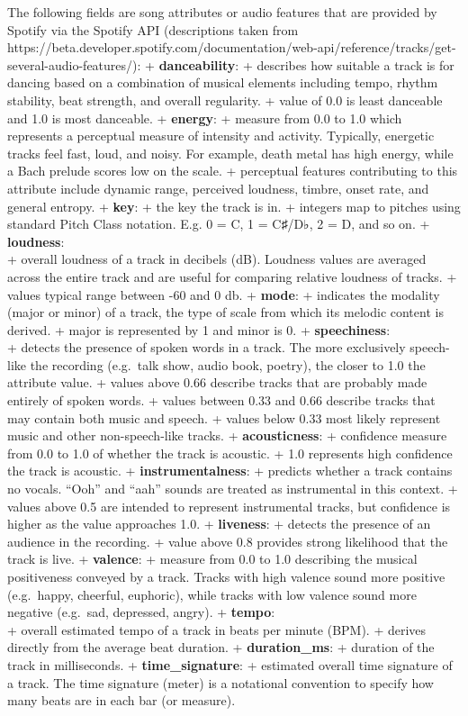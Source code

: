 \documentclass[11pt]{article}
\begin{document}
The following fields are song attributes or audio features that are
provided by Spotify via the Spotify API (descriptions taken from
https://beta.developer.spotify.com/documentation/web-api/reference/tracks/get-several-audio-features/):
+ \textbf{danceability}: + describes how suitable a track is for dancing
based on a combination of musical elements including tempo, rhythm
stability, beat strength, and overall regularity. + value of 0.0 is
least danceable and 1.0 is most danceable. + \textbf{energy}: + measure
from 0.0 to 1.0 which represents a perceptual measure of intensity and
activity. Typically, energetic tracks feel fast, loud, and noisy. For
example, death metal has high energy, while a Bach prelude scores low on
the scale. + perceptual features contributing to this attribute include
dynamic range, perceived loudness, timbre, onset rate, and general
entropy. + \textbf{key}: + the key the track is in. + integers map to
pitches using standard Pitch Class notation. E.g. 0 = C, 1 = C♯/D♭, 2 =
D, and so on. + \textbf{loudness}:\\
+ overall loudness of a track in decibels (dB). Loudness values are
averaged across the entire track and are useful for comparing relative
loudness of tracks. + values typical range between -60 and 0 db. +
\textbf{mode}: + indicates the modality (major or minor) of a track, the
type of scale from which its melodic content is derived. + major is
represented by 1 and minor is 0. + \textbf{speechiness}:\\
+ detects the presence of spoken words in a track. The more exclusively
speech-like the recording (e.g.~talk show, audio book, poetry), the
closer to 1.0 the attribute value. + values above 0.66 describe tracks
that are probably made entirely of spoken words. + values between 0.33
and 0.66 describe tracks that may contain both music and speech. +
values below 0.33 most likely represent music and other non-speech-like
tracks. + \textbf{acousticness}: + confidence measure from 0.0 to 1.0 of
whether the track is acoustic. + 1.0 represents high confidence the
track is acoustic. + \textbf{instrumentalness}: + predicts whether a
track contains no vocals. ``Ooh'' and ``aah'' sounds are treated as
instrumental in this context. + values above 0.5 are intended to
represent instrumental tracks, but confidence is higher as the value
approaches 1.0. + \textbf{liveness}: + detects the presence of an
audience in the recording. + value above 0.8 provides strong likelihood
that the track is live. + \textbf{valence}: + measure from 0.0 to 1.0
describing the musical positiveness conveyed by a track. Tracks with
high valence sound more positive (e.g.~happy, cheerful, euphoric), while
tracks with low valence sound more negative (e.g.~sad, depressed,
angry). + \textbf{tempo}:\\
+ overall estimated tempo of a track in beats per minute (BPM). +
derives directly from the average beat duration. +
\textbf{duration\_ms}: + duration of the track in milliseconds. +
\textbf{time\_signature}: + estimated overall time signature of a track.
The time signature (meter) is a notational convention to specify how
many beats are in each bar (or measure).
\end{document}

